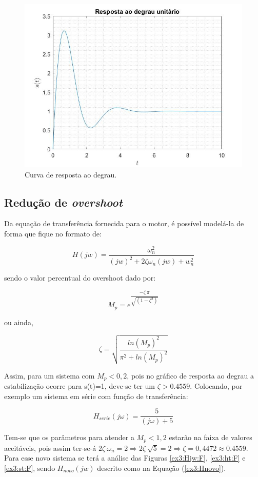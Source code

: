 \documentclass[a4paper,12pt,oneside,openany,table,xcdraw]{article}
\begin{document}
\vspace{0.2cm}
\begin{figure}[H]
\centering
\includegraphics[width=14cm]{ex3-st}
\caption{Curva de resposta ao degrau.}
\label{ex3:st}
\end{figure}

\vspace{0.3cm}
\subsection{Redução de \emph{overshoot}}
Da equação de transferência fornecida para o motor, é possível modelá-la de forma que fique no formato de:

$$H(jw) =\dfrac{\omega_n ^2}{(jw)^2 + 2 \zeta \omega_n (jw)+ w_n ^2} $$

\vspace{0.3cm}
sendo o valor percentual do overshoot dado por: 

$$ M_p = e^{\dfrac{-\zeta\ \pi}{\sqrt{(1-\zeta^2)}}}$$

ou ainda,

$$ \zeta = \sqrt{\dfrac{ln(M_p)^2}{\pi^2 + ln(M_p)^2}}$$

\vspace{0.4cm}
Assim, para um sistema com $M_p< 0,2$, pois no gráfico de resposta ao degrau a estabilização ocorre para s(t)=1, deve-se ter um $\zeta > 0.4559$. Colocando, por exemplo um sistema em série com função de transferência:


$$H_{serie}(j\omega) = \dfrac{5}{(j\omega)+5}$$

\vspace{0.8cm}
Tem-se que os parâmetros para atender a $M_p< 1,2$ estarão na faixa de valores aceitáveis, pois assim ter-se-á $2\zeta\ \omega_n=2 \Rightarrow 2\zeta\ \sqrt{5}=2 \Rightarrow \zeta = 0,4472 \approx 0.4559$. Para esse novo sistema se terá a análise das Figuras \ref{ex3:Hjw:F}, \ref{ex3:ht:F} e \ref{ex3:st:F}, sendo $H_{novo}(jw)$ descrito como na Equação (\ref{ex3:Hnovo}).
\end{document}
